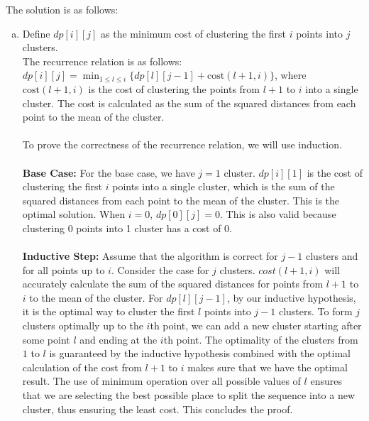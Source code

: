 \documentclass[10pt]{article}
\begin{document}
\begin{solution}
The solution is as follows:
    \begin{enumerate} [(a)]
        \item Define $dp[i][j]$ as the minimum cost of clustering the first $i$ points into $j$ clusters. 
        \\ 
        The recurrence relation is as follows: $dp[i][j] = \min_{1 \leq l \leq i} \{dp[l][j-1] + \text{cost}(l+1, i)\}$, where $\text{cost}(l+1, i)$ is the cost of clustering the points from $l+1$ to $i$ into a single cluster. The cost is calculated as the sum of the squared distances from each point to the mean of the cluster. 
        \\\\
        To prove the correctness of the recurrence relation, we will use induction.
        \\ \\
        \textbf{Base Case:} For the base case, we have $j = 1$ cluster. $dp[i][1]$ is the cost of clustering the first $i$ points into a single cluster, which is the sum of the squared distances from each point to the mean of the cluster. This is the optimal solution. When $i = 0$, $dp[0][j] = 0$. This is also valid because clustering 0 points into 1 cluster has a cost of 0.
        \\ \\
        \textbf{Inductive Step:} Assume that the algorithm is correct for $j-1$ clusters and for all points up to $i$. Consider the case for $j$ clusters. $cost(l + 1, i)$ will accurately calculate the sum of the squared distances for points from $l+1$ to $i$ to the mean of the cluster. For $dp[l][j-1]$, by our inductive hypothesis, it is the optimal way to cluster the first $l$ points into $j-1$ clusters. To form $j$ clusters optimally up to the $i$th point, we 
        can add a new cluster starting after some point $l$ and ending at the $i$th point. The optimality of the clusters from $1$ to $l$ is guaranteed by the inductive hypothesis combined with the optimal calculation of the cost from $l+1$ to $i$ makes sure that we have the optimal result. The use of minimum operation over all possible values of $l$ ensures that we are selecting the best possible place to split the sequence into a new cluster, thus ensuring the least cost. This concludes the proof.


\end{enumerate}
\end{solution}
\end{document}
